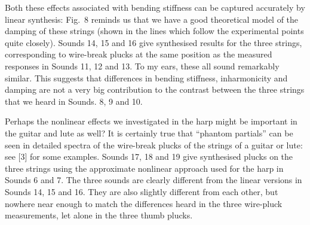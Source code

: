 
  Both these effects associated with bending stiffness can be captured 
  accurately by linear synthesis: Fig.\ 8 reminds us that we have a good 
  theoretical model of the damping of these strings (shown in the lines which 
  follow the experimental points quite closely). Sounds 14, 15 and 16 give 
  synthesised results for the three strings, corresponding to wire-break plucks 
  at the same position as the measured responses in Sounds 11, 12 and 13. To my 
  ears, these all sound remarkably similar. This suggests that differences in 
  bending stiffness, inharmonicity and damping are not a very big contribution 
  to the contrast between the three strings that we heard in Sounds. 8, 9 and 
  10. 




  Perhaps the nonlinear effects we investigated in the harp might be important 
  in the guitar and lute as well? It is certainly true that “phantom partials” 
  can be seen in detailed spectra of the wire-break plucks of the strings of a 
  guitar or lute: see [3] for some examples. Sounds 17, 18 and 19 give 
  synthesised plucks on the three strings using the approximate nonlinear 
  approach used for the harp in Sounds 6 and 7. The three sounds are clearly 
  different from the linear versions in Sounds 14, 15 and 16. They are also 
  slightly different from each other, but nowhere near enough to match the 
  differences heard in the three wire-pluck measurements, let alone in the 
  three thumb plucks. 




